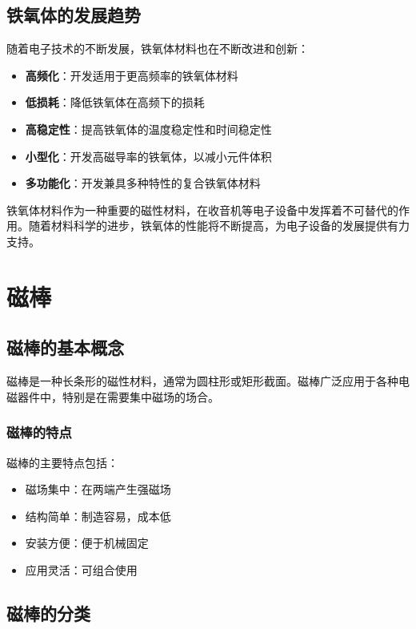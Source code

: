 \documentclass[12pt,UTF8]{ctexbook}
\begin{document}
\section{铁氧体的发展趋势}

随着电子技术的不断发展，铁氧体材料也在不断改进和创新：

\begin{itemize}[leftmargin=2cm]
    \item \textbf{高频化}：开发适用于更高频率的铁氧体材料
    \item \textbf{低损耗}：降低铁氧体在高频下的损耗
    \item \textbf{高稳定性}：提高铁氧体的温度稳定性和时间稳定性
    \item \textbf{小型化}：开发高磁导率的铁氧体，以减小元件体积
    \item \textbf{多功能化}：开发兼具多种特性的复合铁氧体材料
\end{itemize}

铁氧体材料作为一种重要的磁性材料，在收音机等电子设备中发挥着不可替代的作用。随着材料科学的进步，铁氧体的性能将不断提高，为电子设备的发展提供有力支持。

\chapter{磁棒}

\section{磁棒的基本概念}

磁棒是一种长条形的磁性材料，通常为圆柱形或矩形截面。磁棒广泛应用于各种电磁器件中，特别是在需要集中磁场的场合。

\subsection{磁棒的特点}

磁棒的主要特点包括：

\begin{itemize}[leftmargin=2cm]
    \item 磁场集中：在两端产生强磁场
    \item 结构简单：制造容易，成本低
    \item 安装方便：便于机械固定
    \item 应用灵活：可组合使用
\end{itemize}

\section{磁棒的分类}
\end{document}
